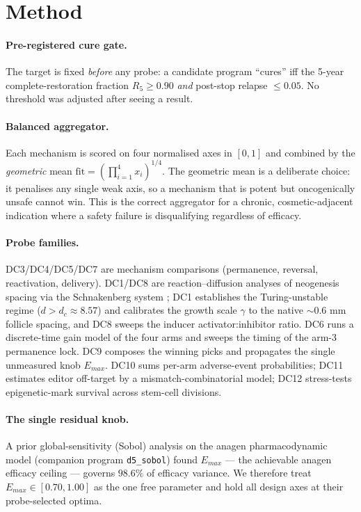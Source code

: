 \documentclass[11pt,a4paper]{article}
\begin{document}
\section{Method}
\label{sec:method}

\paragraph{Pre-registered cure gate.} The target is fixed \emph{before} any probe:
a candidate program ``cures'' iff the 5-year complete-restoration fraction
$R_{5} \geq 0.90$ \emph{and} post-stop relapse $\leq 0.05$. No threshold was
adjusted after seeing a result.

\paragraph{Balanced aggregator.} Each mechanism is scored on four normalised axes
in $[0,1]$ and combined by the \emph{geometric} mean
$\mathrm{fit}=\left(\prod_{i=1}^{4} x_i\right)^{1/4}$.
The geometric mean is a deliberate choice: it penalises any single weak axis, so a
mechanism that is potent but oncogenically unsafe cannot win. This is the correct
aggregator for a chronic, cosmetic-adjacent indication where a safety failure is
disqualifying regardless of efficacy.

\paragraph{Probe families.}
DC3/DC4/DC5/DC7 are mechanism comparisons (permanence, reversal, reactivation,
delivery). DC1/DC8 are reaction--diffusion analyses of neogenesis spacing via the
Schnakenberg system \citep{schnakenberg1979}; DC1 establishes the Turing-unstable
regime ($d>d_c\approx 8.57$) and calibrates the growth scale $\gamma$ to the native
${\sim}0.6$ mm follicle spacing, and DC8 sweeps the inducer activator:inhibitor
ratio. DC6 runs a discrete-time gain model of the four arms and sweeps the timing
of the arm-3 permanence lock. DC9 composes the winning picks and propagates the
single unmeasured knob $E_{max}$. DC10 sums per-arm adverse-event probabilities;
DC11 estimates editor off-target by a mismatch-combinatorial model; DC12
stress-tests epigenetic-mark survival across stem-cell divisions.

\paragraph{The single residual knob.} A prior global-sensitivity (Sobol) analysis
on the anagen pharmacodynamic model (companion program \texttt{d5\_sobol}) found
$E_{max}$ --- the achievable anagen efficacy ceiling --- governs $98.6\%$ of
efficacy variance. We therefore treat $E_{max}\in[0.70,1.00]$ as the one free
parameter and hold all design axes at their probe-selected optima.
\end{document}
